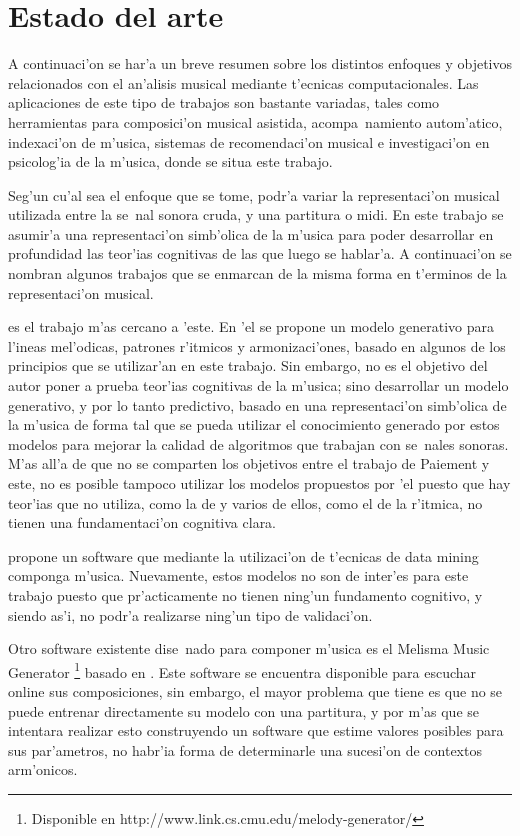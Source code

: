 \section{Estado del arte}
\label{sec:state_art}
A continuaci'on se har'a un breve resumen sobre los distintos enfoques y objetivos relacionados con el an'alisis musical mediante
t'ecnicas computacionales. Las aplicaciones de este tipo de trabajos son bastante variadas, tales como herramientas para 
composici'on musical asistida, acompa~namiento autom'atico, indexaci'on de m'usica, sistemas de recomendaci'on musical e 
investigaci'on en psicolog'ia de la m'usica, donde se situa este trabajo.

Seg'un cu'al sea el enfoque que se tome, podr'a variar la representaci'on musical utilizada entre la se~nal sonora cruda, y una partitura o midi.
En este trabajo se asumir'a una representaci'on simb'olica de la m'usica para poder desarrollar en profundidad las teor'ias cognitivas de las 
que luego se hablar'a. A continuaci'on se nombran algunos trabajos que se enmarcan de la misma forma en t'erminos de la representaci'on musical.

\cite{PaieThesis} es el trabajo m'as cercano a 'este. En 'el se propone un modelo generativo para l'ineas mel'odicas, 
patrones r'itmicos y armonizaci'ones, basado en algunos de los principios que se utilizar'an en este trabajo. 
Sin embargo, no es el objetivo del autor poner a prueba teor'ias cognitivas de la m'usica; sino desarrollar un modelo generativo,
y por lo tanto predictivo, basado en una representaci'on simb'olica de la m'usica de forma tal que se pueda utilizar el conocimiento generado por estos
modelos para mejorar la calidad de algoritmos que trabajan con se~nales sonoras. M'as all'a de que no se comparten los objetivos entre el trabajo de 
Paiement y este, no es posible tampoco utilizar los modelos propuestos por 'el puesto que hay teor'ias que no utiliza, como la de \cite{Lerdahl2001} 
y varios de ellos, como el de la r'itmica, no tienen una fundamentaci'on cognitiva clara.

\cite{Shih-Chuan} propone un software que mediante la utilizaci'on de t'ecnicas de data mining componga m'usica. Nuevamente, estos modelos
no son de inter'es para este trabajo puesto que pr'acticamente no tienen ning'un fundamento cognitivo, y siendo as'i, no podr'a realizarse 
ning'un tipo de validaci'on.


Otro software existente dise~nado para componer m'usica es el Melisma Music Generator
\footnote{Disponible en http://www.link.cs.cmu.edu/melody-generator/} basado en \cite{Temperley2004}. 
Este software se encuentra disponible para escuchar online sus composiciones, sin embargo, el mayor problema 
que tiene es que no se puede entrenar directamente su modelo con una partitura, y por m'as que se intentara realizar esto construyendo un software 
que estime valores posibles para sus par'ametros, no habr'ia forma de determinarle una sucesi'on de contextos arm'onicos.


